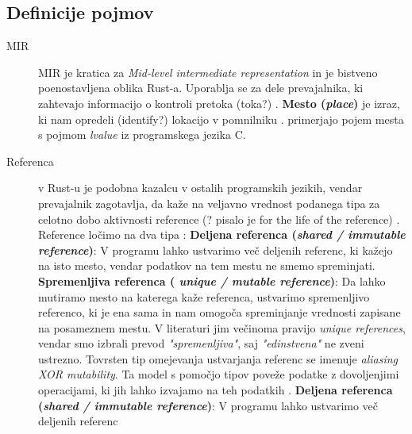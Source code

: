 \documentclass{article}
\begin{document}


\subsection{Definicije pojmov}

\begin{description}
	\item[MIR] MIR je kratica za \textit{Mid-level intermediate representation} in je bistveno poenostavljena oblika Rust-a.
	      Uporablja se za dele prevajalnika, ki zahtevajo informacijo o kontroli pretoka (toka?) \cite{MIRMidlevelIR}.
	      \subitem \textbf{Mesto (\textit{place})} je izraz, ki nam opredeli (identify?) lokacijo v pomnilniku \cite{MIRMidlevelIR}.
	      \citeauthor{weissOxideEssenceRust2019} primerjajo pojem mesta s pojmom \textit{lvalue} iz programskega jezika C.
	\item[Referenca] v Rust-u je podobna kazalcu v ostalih programskih jezikih, vendar prevajalnik zagotavlja, da kaže
	      na veljavno vrednost podanega tipa za celotno dobo aktivnosti reference (? pisalo je for the life of the reference) \cite{klabnikRustProgrammingLanguage2023}.
	      Reference ločimo na dva tipa \cite{crichtonGroundedConceptualModel2023,yanovskiGhostCellSeparatingPermissions2021,weissOxideEssenceRust2019}:
	      \subitem \textbf{Deljena referenca (\textit{shared / immutable reference})}: V programu lahko ustvarimo več deljenih referenc, ki
	      kažejo na isto mesto, vendar podatkov na tem mestu ne smemo spreminjati.
	      \subitem \textbf{Spremenljiva referenca (\textit{ unique / mutable reference})}: Da lahko mutiramo mesto na katerega kaže
	      referenca, ustvarimo spremenljivo referenco, ki je ena sama in nam omogoča spreminjanje vrednosti zapisane na posameznem mestu.
	      V literaturi jim večinoma pravijo \textit{unique references}, vendar smo izbrali prevod \textit{"spremenljiva"}, saj \textit{"edinstvena"} ne zveni ustrezno.
	      \subitem Tovrsten tip omejevanja ustvarjanja referenc se imenuje \textit{aliasing XOR mutability}. Ta model s pomočjo tipov
	      poveže podatke z dovoljenjimi operacijami, ki jih lahko izvajamo na teh podatkih \cite{yanovskiGhostCellSeparatingPermissions2021}.
	      \subitem \textbf{Deljena referenca (\textit{shared / immutable reference})}: V programu lahko ustvarimo več deljenih referenc

\end{description}
\end{document}
